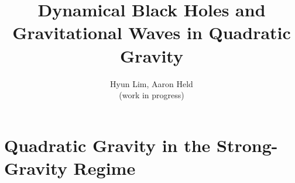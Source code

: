 \documentclass[a4paper,oneside,openany,11pt]{memoir}
\numberwithin{equation}{section} %
\begin{document}
\title{\HUGE Dynamical Black Holes and Gravitational Waves in Quadratic Gravity}

\author{Hyun Lim, Aaron Held\\(work in progress)}


\maketitle

\tableofcontents*


\section{Quadratic Gravity in the Strong-Gravity Regime}
\end{document}
